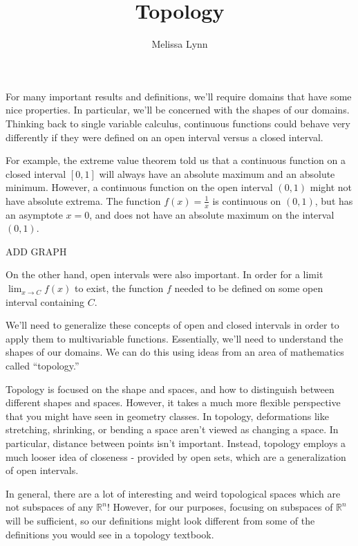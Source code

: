 \documentclass{ximera}
\title{Topology}
\author{Melissa Lynn}
\begin{document}
 
\begin{abstract}
\end{abstract} 
\maketitle

For many important results and definitions, we'll require domains that have some nice properties. In particular, we'll be concerned with the shapes of our domains. Thinking back to single variable calculus, continuous functions could behave very differently if they were defined on an open interval versus a closed interval.

For example, the extreme value theorem told us that a continuous function on a closed interval $[0,1]$ will always have an absolute maximum and an absolute minimum. However, a continuous function on the open interval $(0,1)$ might not have absolute extrema. The function $f(x) = \frac{1}{x}$ is continuous on $(0,1)$, but has an asymptote $x=0$, and does not have an absolute maximum on the interval $(0,1)$.

ADD GRAPH

On the other hand, open intervals were also important. In order for a limit $\lim_{x\rightarrow C} f(x)$ to exist, the function $f$ needed to be defined on some open interval containing $C$.

We'll need to generalize these concepts of open and closed intervals in order to apply them to multivariable functions. Essentially, we'll need to understand the shapes of our domains. We can do this using ideas from an area of mathematics called ``topology.''

Topology is focused on the shape and spaces, and how to distinguish between different shapes and spaces. However, it takes a much more flexible perspective that you might have seen in geometry classes. In topology, deformations like stretching, shrinking, or bending a space aren't viewed as changing a space. In particular, distance between points isn't important. Instead, topology employs a much looser idea of closeness - provided by open sets, which are a generalization of open intervals.

In general, there are a lot of interesting and weird topological spaces which are not subspaces of any $\mathbb{R}^n$! However, for our purposes, focusing on subspaces of $\mathbb{R}^n$ will be sufficient, so our definitions might look different from some of the definitions you would see in a topology textbook. 
\end{document}
